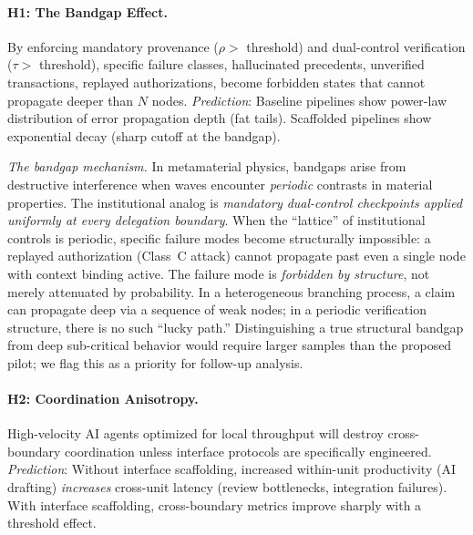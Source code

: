 \documentclass[runningheads]{llncs}
\begin{document}
\paragraph{H1: The Bandgap Effect.}
By enforcing mandatory provenance ($\rho >$ threshold) and dual-control verification ($\tau >$ threshold), specific failure classes, hallucinated precedents, unverified transactions, replayed authorizations, become forbidden states that cannot propagate deeper than $N$ nodes. \emph{Prediction}: Baseline pipelines show power-law distribution of error propagation depth (fat tails). Scaffolded pipelines show exponential decay (sharp cutoff at the bandgap).

\emph{The bandgap mechanism.} In metamaterial physics, bandgaps arise from destructive interference when waves encounter \emph{periodic} contrasts in material properties. The institutional analog is \emph{mandatory dual-control checkpoints applied uniformly at every delegation boundary}. When the ``lattice'' of institutional controls is periodic, specific failure modes become structurally impossible: a replayed authorization (Class~C attack) cannot propagate past even a single node with context binding active. The failure mode is \emph{forbidden by structure}, not merely attenuated by probability. In a heterogeneous branching process, a claim can propagate deep via a sequence of weak nodes; in a periodic verification structure, there is no such ``lucky path.'' Distinguishing a true structural bandgap from deep sub-critical behavior would require larger samples than the proposed pilot; we flag this as a priority for follow-up analysis.

\paragraph{H2: Coordination Anisotropy.}
High-velocity AI agents optimized for local throughput will destroy cross-boundary coordination unless interface protocols are specifically engineered. \emph{Prediction}: Without interface scaffolding, increased within-unit productivity (AI drafting) \emph{increases} cross-unit latency (review bottlenecks, integration failures). With interface scaffolding, cross-boundary metrics improve sharply with a threshold effect.
\end{document}
